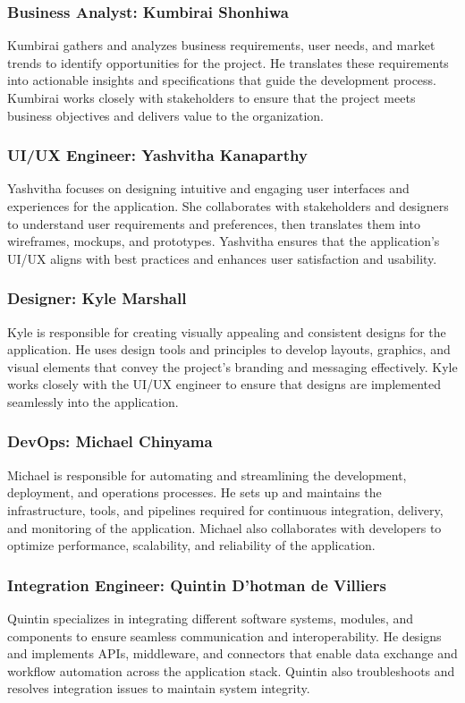 \documentclass{article}
\begin{document}
\begin{itemsize}
\subsubsection{Business Analyst: Kumbirai Shonhiwa}
Kumbirai gathers and analyzes business requirements, user needs, and market trends to identify opportunities for the project. He translates these requirements into actionable insights and specifications that guide the development process. Kumbirai works closely with stakeholders to ensure that the project meets business objectives and delivers value to the organization.
\subsubsection{UI/UX Engineer: Yashvitha Kanaparthy}
Yashvitha focuses on designing intuitive and engaging user interfaces and experiences for the application. She collaborates with stakeholders and designers to understand user requirements and preferences, then translates them into wireframes, mockups, and prototypes. Yashvitha ensures that the application's UI/UX aligns with best practices and enhances user satisfaction and usability.
\subsubsection{Designer: Kyle Marshall}
Kyle is responsible for creating visually appealing and consistent designs for the application. He uses design tools and principles to develop layouts, graphics, and visual elements that convey the project's branding and messaging effectively. Kyle works closely with the UI/UX engineer to ensure that designs are implemented seamlessly into the application.
\subsubsection{DevOps: Michael Chinyama}
Michael is responsible for automating and streamlining the development, deployment, and operations processes. He sets up and maintains the infrastructure, tools, and pipelines required for continuous integration, delivery, and monitoring of the application. Michael also collaborates with developers to optimize performance, scalability, and reliability of the application.
\subsubsection{Integration Engineer: Quintin D'hotman de Villiers}
Quintin specializes in integrating different software systems, modules, and components to ensure seamless communication and interoperability. He designs and implements APIs, middleware, and connectors that enable data exchange and workflow automation across the application stack. Quintin also troubleshoots and resolves integration issues to maintain system integrity.

\end{itemsize}
\end{document}
